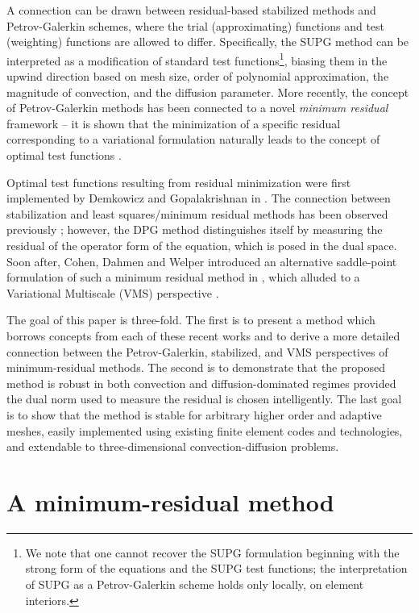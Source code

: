 \documentclass[final,leqno]{siamltex}
\begin{document}
A connection can be drawn between residual-based stabilized methods and Petrov-Galerkin schemes, where the trial (approximating) functions and test (weighting) functions are allowed to differ.  Specifically, the SUPG method can be interpreted as a modification of standard test functions\footnote{We note that one cannot recover the SUPG formulation beginning with the strong form of the equations and the SUPG test functions; the interpretation of SUPG as a Petrov-Galerkin scheme holds only locally, on element interiors.}, biasing them in the upwind direction based on mesh size, order of polynomial approximation, the magnitude of convection, and the diffusion parameter.  More recently, the concept of Petrov-Galerkin methods has been connected to a novel \textit{minimum residual} framework -- it is shown that the minimization of a specific residual corresponding to a variational formulation naturally leads to the concept of optimal test functions \cite{overviewDPG}.  

Optimal test functions resulting from residual minimization were first implemented by Demkowicz and Gopalakrishnan in \cite{DPG2,DPG1}.  The connection between stabilization and least squares/minimum residual methods has been observed previously \cite{GLS}; however, the DPG method distinguishes itself by measuring the residual of the operator form of the equation, which is posed in the dual space.  Soon after, Cohen, Dahmen and Welper introduced an alternative saddle-point formulation of such a minimum residual method in \cite{DahmenVariationalStabilization}, which alluded to a Variational Multiscale (VMS) perspective \cite{VMS1,VMS2,HughesVMS}.  


The goal of this paper is three-fold.  The first is to present a method which borrows concepts from each of these recent works and to derive a more detailed connection between the Petrov-Galerkin, stabilized, and VMS perspectives of minimum-residual methods.  The second is to demonstrate that the proposed method is robust in both convection and diffusion-dominated regimes provided the dual norm used to measure the residual is chosen intelligently.  The last goal is to show that the method is stable for arbitrary higher order and adaptive meshes, easily implemented using existing finite element codes and technologies, and extendable to three-dimensional convection-diffusion problems.

\section{A minimum-residual method}
\end{document}
